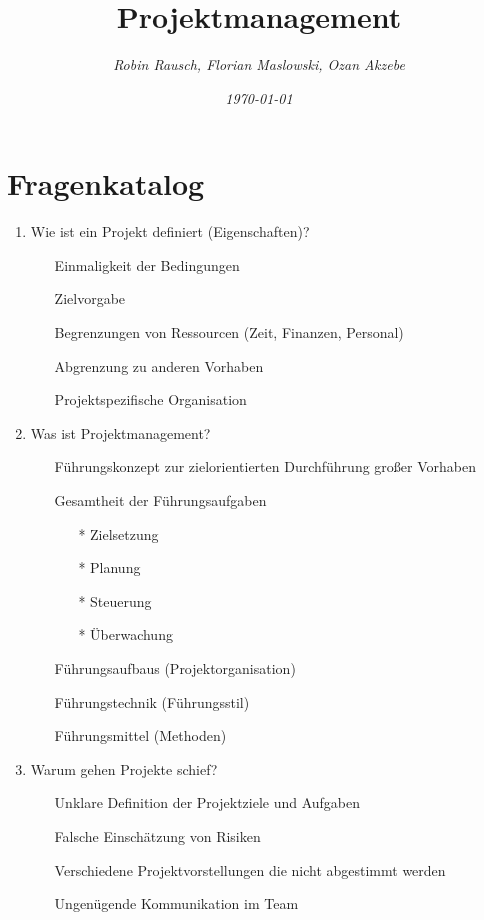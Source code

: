 \documentclass[12pt,a4paper]{article}
\author{\slshape Robin Rausch, Florian Maslowski, Ozan Akzebe}
\title{Projektmanagement}
\date{\slshape \today}
\begin{document}
\maketitle
\section{Fragenkatalog}
\begin{enumerate}
	\item Wie ist ein Projekt definiert (Eigenschaften)?
		\begin{enumerate}
		\item[] Einmaligkeit der Bedingungen 
		\item[] Zielvorgabe 
		\item[] Begrenzungen von Ressourcen (Zeit, Finanzen, Personal)
		\item[] Abgrenzung zu anderen Vorhaben 
		\item[] Projektspezifische Organisation 
		\end{enumerate}
	\item Was ist Projektmanagement?
		\begin{enumerate}
		\item[] Führungskonzept zur zielorientierten Durchführung großer Vorhaben 
		\item[] Gesamtheit der Führungsaufgaben 
			\begin{enumerate}
			\item[*] Zielsetzung
			\item[*] Planung
			\item[*] Steuerung
			\item[*] Überwachung
			\end{enumerate}
		\item[] Führungsaufbaus (Projektorganisation)
		\item[] Führungstechnik (Führungsstil) 
		\item[] Führungsmittel (Methoden) 
		\end{enumerate}
	\item Warum gehen Projekte schief?
		\begin{enumerate}
		\item[] Unklare Definition der Projektziele und Aufgaben 
		\item[] Falsche Einschätzung von Risiken 
		\item[] Verschiedene Projektvorstellungen die nicht abgestimmt werden  
		\item[] Ungenügende Kommunikation im Team 
		\end{enumerate}

\end{enumerate}
\end{document}
